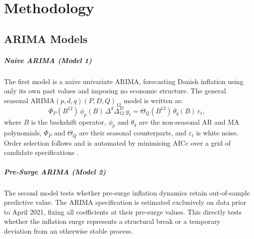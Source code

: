 \chapter{Methodology}\label{sec:methodology}


\section{ARIMA Models}

\paragraph{Naive ARIMA (\textit{Model 1})}
The first model is a naive univariate ARIMA, forecasting Danish inflation using only its own past values and imposing no economic structure. The general seasonal ARIMA$(p,d,q)(P,D,Q)_{12}$ model is written as:
\begin{equation}
    \Phi_P(B^{12})\,\phi_p(B)\,\Delta^d\Delta^D_{12}\,y_t
= \Theta_Q(B^{12})\,\theta_q(B)\,\varepsilon_t,
\end{equation}
where $B$ is the backshift operator, $\phi_p$ and $\theta_q$ are the non-seasonal AR and MA polynomials, $\Phi_P$ and $\Theta_Q$ are their seasonal counterparts, and $\varepsilon_t$ is white noise. Order selection follows \textcite{box_jenkins_1976} and is automated by minimising AICc over a grid of candidate specifications \parencite{hyndman_athanasopoulos_2021}. 

\paragraph{Pre-Surge ARIMA (\textit{Model 2})}
The second model tests whether pre-surge inflation dynamics retain out-of-sample predictive value. The ARIMA specification is estimated exclusively on data prior to April 2021, fixing all coefficients at their pre-surge values. This directly tests whether the inflation surge represents a structural break or a temporary deviation from an otherwise stable process.

